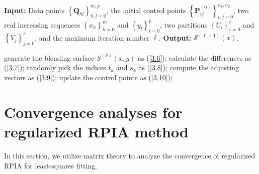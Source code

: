 \documentclass[11pt]{article}
\numberwithin{equation}{section}
\begin{document}
\begin{algorithm}
\caption{Regularized RPIA for surface fitting}
\label{algorithm2}
\begin{algorithmic}[1]
\STATE \textbf{Input:} Data points $\left\{\boldsymbol{Q}_{h l}\right\}_{h, l=0}^{m, p}$, the initial control points $\left\{\boldsymbol{P}_{i j}^{(0)}\right\}_{i, j=0}^{n_{1}, n_{2}}$, two real increasing sequences $\left\{x_{h}\right\}_{h=0}^{m}$ and $\left\{y_{l}\right\}_{l=0}^{p}$, two partitions $\left\{U_{i}\right\}_{i=0}^{t}$ and $\left\{V_{j}\right\}_{j=0}^{s}$, and the maximum iteration number $\ell$.
\STATE \textbf{Output:} \(\mathcal{S}^{(\ell+1)}(x)\).

      \STATE generate the blending surface $S^{(k)}(x, y)$ as (\ref{3.6});
      \STATE calculate the differences as (\ref{3.7});
      \STATE randomly pick the indices $t_{k}$ and $s_{k}$ as (\ref{3.8});
      \STATE compute the adjusting vectors as (\ref{3.9});
      \STATE update the control points as (\ref{3.10});
\ENDFOR
\end{algorithmic}
\end{algorithm}

\section{Convergence analyses for regularized RPIA method}
In this section, we utilize matrix theory to analyze the convergence of regularized RPIA for least-squares fitting.
\end{document}

